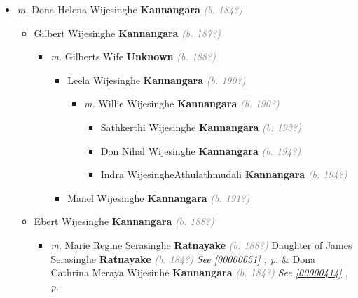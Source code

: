 \documentclass[10pt, openany]{book}
\begin{document}
\begin{itemize}
{\begin{itemize}
{\begin{itemize}
\item{\textit{m.} Dona Helena Wijesinghe \textbf{Kannangara} \textcolor{gray}{\textit{(b. 184?)}}   \label{couple:00000398:00000417} \begin{itemize}
\item{Gilbert Wijesinghe \textbf{Kannangara} \textcolor{gray}{\textit{(b. 187?)}}
\begin{itemize}
\item{\textit{m.} Gilberts Wife \textbf{Unknown} \textcolor{gray}{\textit{(b. 188?)}}   \label{couple:00000431:00000876} \begin{itemize}
\item{Leela Wijesinghe \textbf{Kannangara} \textcolor{gray}{\textit{(b. 190?)}}
\begin{itemize}
\item{\textit{m.} Willie Wijesinghe \textbf{Kannangara} \textcolor{gray}{\textit{(b. 190?)}}   \label{couple:00000442:00000463} \begin{itemize}
\item{Sathkerthi Wijesinghe \textbf{Kannangara} \textcolor{gray}{\textit{(b. 193?)}}
  }
\item{Don Nihal Wijesinghe \textbf{Kannangara} \textcolor{gray}{\textit{(b. 194?)}}
   }
\item{Indra WijesingheAthulathmudali \textbf{Kannangara} \textcolor{gray}{\textit{(b. 194?)}}
  }
\end{itemize}}
\end{itemize}
  }
\item{Manel Wijesinghe \textbf{Kannangara} \textcolor{gray}{\textit{(b. 191?)}}
  }
\end{itemize}}
\end{itemize}
  }
\item{Ebert Wijesinghe \textbf{Kannangara} \textcolor{gray}{\textit{(b. 188?)}}
\begin{itemize}
\item{\textit{m.} Marie Regine Serasinghe \textbf{Ratnayake} \textcolor{gray}{\textit{(b. 188?)}} Daughter of  James Serasinghe \textbf{Ratnayake} \textcolor{gray}{\textit{(b. 184?)}} \textcolor{slteal}{\textit{See  \autoref{00000651} \textit{, p. \pageref{00000651} }}}  \&  Dona Cathrina Meraya Wijesinhe \textbf{Kannangara} \textcolor{gray}{\textit{(b. 184?)}} \textcolor{slteal}{\textit{See  \autoref{00000414} \textit{, p. \pageref{00000414} }}}   \label{couple:00000427:00000653} \begin{itemize}

\end{itemize}}
\end{itemize}}
\end{itemize}}
\end{itemize}}
\end{itemize}}
\end{itemize}
\end{document}
